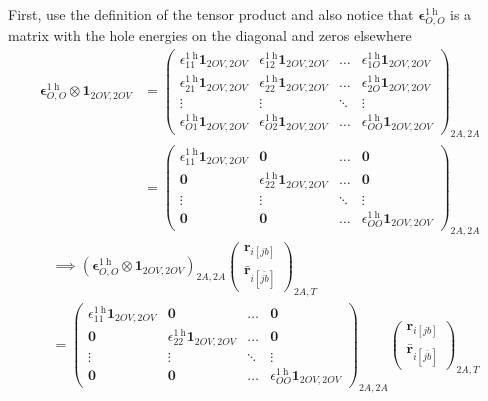 First, use the definition of the tensor product and also notice that $\bm{\epsilon}^{1 \mathrm{~h}}_{O,O}$ is a matrix with the hole energies on the diagonal and zeros elsewhere
\begin{align}
    \bm{\epsilon}^{1 \mathrm{~h}}_{O,O} \otimes \bm{1}_{2OV,2OV} &= \begin{pmatrix}
\epsilon^{1 \mathrm{~h}}_{11} \bm{1}_{2OV,2OV} & \epsilon^{1 \mathrm{~h}}_{12} \bm{1}_{2OV,2OV} & \dots & \epsilon^{1 \mathrm{~h}}_{1O} \bm{1}_{2OV,2OV} \\[6pt]
\epsilon^{1 \mathrm{~h}}_{21} \bm{1}_{2OV,2OV} & \epsilon^{1 \mathrm{~h}}_{22} \bm{1}_{2OV,2OV} & \dots & \epsilon^{1 \mathrm{~h}}_{2O} \bm{1}_{2OV,2OV} \\[6pt]
\vdots & \vdots & \ddots & \vdots \\[6pt]
\epsilon^{1 \mathrm{~h}}_{O1} \bm{1}_{2OV,2OV} & \epsilon^{1 \mathrm{~h}}_{O2} \bm{1}_{2OV,2OV} & \dots & \epsilon^{1 \mathrm{~h}}_{OO} \bm{1}_{2OV,2OV}
\end{pmatrix}_{2A,2A}\\
&= \begin{pmatrix}
\epsilon^{1 \mathrm{~h}}_{11} \bm{1}_{2OV,2OV} & \bm{0} & \dots & \bm{0} \\[6pt]
\bm{0} & \epsilon^{1 \mathrm{~h}}_{22} \bm{1}_{2OV,2OV} & \dots & \bm{0} \\[6pt]
\vdots & \vdots & \ddots & \vdots \\[6pt]
\bm{0} & \bm{0} & \dots & \epsilon^{1 \mathrm{~h}}_{OO} \bm{1}_{2OV,2OV}
\end{pmatrix}_{2A,2A}
\end{align}
\begin{align}
    &\implies \left(\bm{\epsilon}^{1 \mathrm{~h}}_{O,O} \otimes \bm{1}_{2OV,2OV} \right)_{2A,2A}\begin{pmatrix}
    \bm{r}_{i[jb]} \\
\bm{\bar{r}}_{i[\bar{jb}]}
\end{pmatrix}_{2A,T}\\
& = \begin{pmatrix}
\epsilon^{1 \mathrm{~h}}_{11} \bm{1}_{2OV,2OV} & \bm{0} & \dots & \bm{0} \\[6pt]
\bm{0} & \epsilon^{1 \mathrm{~h}}_{22} \bm{1}_{2OV,2OV} & \dots & \bm{0} \\[6pt]
\vdots & \vdots & \ddots & \vdots \\[6pt]
\bm{0} & \bm{0} & \dots & \epsilon^{1 \mathrm{~h}}_{OO} \bm{1}_{2OV,2OV}
\end{pmatrix}_{2A,2A} \begin{pmatrix}
    \bm{r}_{i[jb]} \\[6pt]
\bm{\bar{r}}_{i[\bar{jb}]}
\end{pmatrix}_{2A,T} \\
\end{align}
